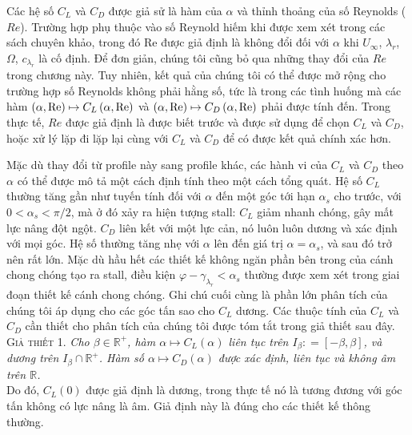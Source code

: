 \documentclass[a4paper,twoside,13pt]{extbook}
\begin{document}
Các hệ số $C_L$ và $C_D$ được giả sử là hàm của $\alpha$ và thỉnh thoảng của số Reynolds ($Re$). Trường hợp phụ thuộc vào số Reynold hiếm khi được xem xét trong các sách chuyên khảo, trong đó Re được giả định là không đổi đối với $\alpha$ khi $U_{\infty}$, $\lambda_r$, $\Omega$, $c_{\lambda_r}$ là cố định. Để đơn giản, chúng tôi cũng bỏ qua những thay đổi của $Re$ trong chương này. Tuy nhiên, kết quả của chúng tôi có thể được mở rộng cho trường hợp số Reynolds không phải hằng số, tức là trong các tình huống mà các hàm $\left( {\alpha ,{\mathop{\rm Re}\nolimits} } \right) \mapsto {C_L}\left( {\alpha ,{\mathop{\rm Re}\nolimits} } \right)$
và $\left( {\alpha ,{\mathop{\rm Re}\nolimits} } \right) \mapsto {C_D}\left( {\alpha ,{\mathop{\rm Re}\nolimits} } \right)$ phải được tính đến. Trong thực tế, $Re$ được giả định là được biết trước và được sử dụng để chọn $C_L$ và $C_D$, hoặc xử lý lặp đi lặp lại cùng với $C_L$ và $C_D$ để có được kết quả chính xác hơn.

Mặc dù thay đổi từ profile này sang profile khác, các hành vi của $C_L$ và $C_D$ theo $\alpha$ có thể được mô tả một cách định tính theo một cách tổng quát. Hệ số $C_L$ thường tăng gần như tuyến tính đối với $\alpha$ đến một góc tới hạn $\alpha_s$ cho trước, với $0 < {\alpha _s} < \pi /2$, mà ở đó xảy ra hiện tượng stall: $C_L$ giảm nhanh chóng, gây mất lực nâng đột ngột. $C_D$ liên kết với một lực cản, nó luôn luôn dương và xác định với mọi góc. Hệ số thường tăng nhẹ với $\alpha$ lên đến giá trị $\alpha=\alpha_s$, và sau đó trở nên rất lớn. Mặc dù hầu hết các thiết kế không ngăn phần bên trong của cánh chong chóng tạo ra stall, điều kiện $\varphi  - {\gamma _{{\lambda _r}}} < {\alpha _s}$ thường được xem xét trong giai đoạn thiết kế cánh chong chóng. Ghi chú cuối cùng là phần lớn phân tích của chúng tôi áp dụng cho các góc tấn sao cho $C_L$ dương. Các thuộc tính của $C_L$ và $C_D$ cần thiết cho phân tích của chúng tôi được tóm tắt trong giả thiết sau đây.\\

\textsc{Giả thiết 1}. \textit{Cho $\beta\in\mathbb{R}^+$, hàm $\alpha \mapsto {C_L}\left( \alpha  \right)$ liên tục trên ${I_\beta }: = \left[ { - \beta ,\beta } \right]$, và dương trên ${I_\beta } \cap \mathbb{R}^+$. Hàm số $\alpha  \mapsto {C_D}\left( \alpha  \right)$ được xác định, liên tục và không âm trên $\mathbb{R}$.}\\

Do đó, $C_L(0)$ được giả định là dương, trong thực tế nó là tương đương với góc tấn không có lực nâng là âm. Giả định này là đúng cho các thiết kế thông thường.
\end{document}
